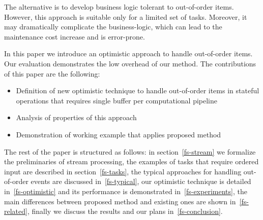 The alternative is to develop business logic tolerant to out-of-order items. However, this approach is suitable only for a limited set of tasks. Moreover, it may dramatically complicate the business-logic, which can lead to the maintenance cost increase and is error-prone.

In this paper we introduce an optimistic approach to handle out-of-order items. Our evaluation demonstrates the low overhead of our method. The contributions of this paper are the following: 

\begin {itemize}
  \item Definition of new optimistic technique to handle out-of-order items in stateful operations that requires single buffer per computational pipeline
  \item Analysis of properties of this approach
  \item Demonstration of working example that applies proposed method
\end {itemize}

The rest of the paper is structured as follows: in section~\ref{fs-stream} we formalize the preliminaries of stream processing, the examples of tasks that require ordered input are described in section~\ref{fs-tasks}, the typical approaches for handling out-of-order events are discussed in~\ref{fs-typical}, our optimistic technique is detailed in~\ref{fs-optimistic} and its performance is demonstrated in~\ref{fs-experiments}, the main differences between proposed method and existing ones are shown in~\ref{fs-related}, finally we discuss the results and our plans in~\ref{fs-conclusion}.
